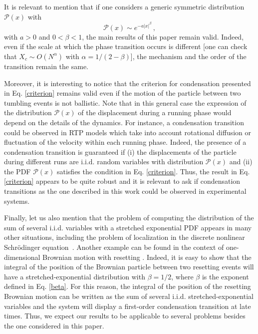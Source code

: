 \documentclass[aps,pre,twocolumn,superscriptaddress,showpacs]{revtex4-1}
\newcommand{\mP}{\mathcal{P}}
\begin{document}
It is relevant to mention that if one considers a generic symmetric distribution $\mP(x)$ with
\begin{equation}
\mP(x)\sim e^{-a|x|^\beta}\,,\label{beta}
\end{equation}
with $a>0$ and $0<\beta<1$, the main results of this paper remain valid. Indeed, even if the scale at which the phase transition occurs is different [one can check that $X_c\sim O(N^{\alpha})$ with $\alpha=1/(2-\beta)$], the mechanism and the order of the transition remain the same. 

Moreover, it is interesting to notice that the criterion for condensation presented in Eq. \eqref{criterion} remains valid even if the motion of the particle between two tumbling events is not ballistic. Note that in this general case the expression of the distribution $\mP(x)$ of the displacement during a running phase would depend on the details of the dynamics. For instance, a condensation transition could be observed in RTP models which take into account rotational diffusion or fluctuation of the velocity within each running phase. Indeed, the presence of a condensation transition is guaranteed if (i) the displacements of the particle during different runs are i.i.d. random variables with distribution $\mP(x)$ and (ii) the PDF $\mP(x)$ satisfies the condition in Eq. \eqref{criterion}. Thus, the result in Eq. \eqref{criterion} appears to be quite robust and it is relevant to ask if condensation transitions as the one described in this work could be observed in experimental systems.


Finally, let us also mention that the problem of computing the distribution of the sum of several i.i.d. variables with a stretched exponential PDF appears in many other situations, including the problem of localization in the discrete nonlinear Schr\"odinger equation~\cite{GIL21,GIL21b}. Another example can be found in the context of one-dimensional Brownian motion with resetting \cite{EM11,EMS20}. Indeed, it is easy to show that the integral of the position of the Brownian particle between two resetting events will have a stretched-exponential distribution with $\beta=1/2$, where $\beta$ is the exponent defined in Eq. \eqref{beta}. For this reason, the integral of the position of the resetting Brownian motion can be written as the sum of several i.i.d. stretched-exponential variables and the system will display a first-order condensation transition at late times. Thus, we expect our results to be applicable to several problems besides the one considered in this paper.
\end{document}
